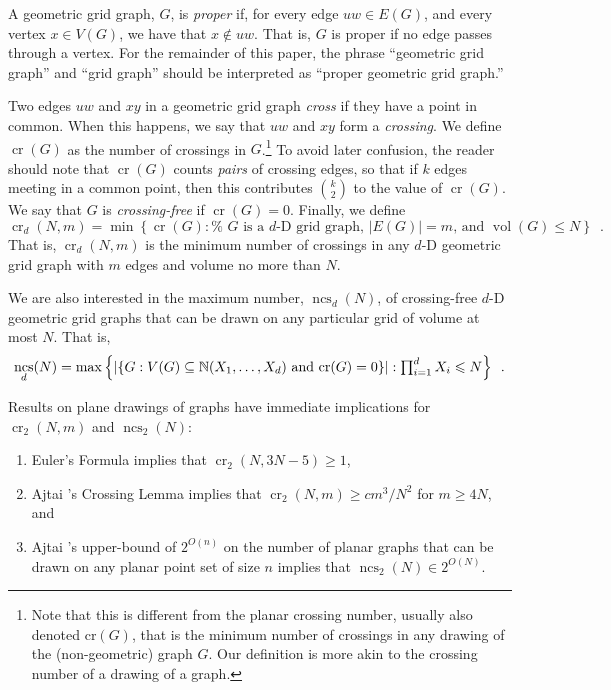 \documentclass[12pt]{article}
\newcommand{\n}{N}
\DeclareMathOperator{\crs}{cr}
\DeclareMathOperator{\ncs}{ncs}
\DeclareMathOperator{\volume}{vol}
\begin{document}
A geometric grid graph, $G$, is \emph{proper} if, for every edge $uw\in
E(G)$, and every vertex $x\in V(G)$, we have that $x\not\in uw$.  That is,
$G$ is proper if no edge passes through a vertex.  For the remainder
of this paper, the phrase ``geometric grid graph'' and ``grid graph''
should be interpreted as ``proper geometric grid graph.''

Two edges $uw$ and $xy$ in a geometric grid graph \emph{cross} if they have a
point in common.  When this happens, we say that $uw$ and $xy$ form
a \emph{crossing}.  We define $\crs(G)$ as the number of crossings
in $G$.\footnote{Note that this is different from the planar crossing
number, usually also denoted $\mathrm{cr}(G)$, that is the minimum number of
crossings in any drawing of the (non-geometric) graph $G$.  Our definition
is more akin to the crossing number of a drawing of a graph.}
To avoid later confusion, the reader should note that 
$\crs(G)$ counts \emph{pairs} of crossing edges, so that if $k$ edges meeting in 
a common point, then this contributes $\binom{k}{2}$ to the value of $\crs(G)$.
We say that
$G$ is \emph{crossing-free} if $\crs(G)=0$.  Finally, we define
\[ \crs_d(\n,m)=\min\left\{\crs(G):\mbox{%
    $G$ is a $d$-D grid graph, $|E(G)|=m$, and $\volume(G)\le\n$}
   \right\} \enspace .
\]
That is, $\crs_d(\n,m)$ is the minimum number of crossings in any
$d$-D geometric grid graph with $m$ edges and volume no more
than $\n$.

We are also interested in the maximum number, $\ncs_d(\n)$, of crossing-free
$d$-D geometric grid graphs that can be drawn on any particular grid of
volume at most $\n$.  That is,
\[
  \ncs_d(\n) = \max\left\{
     \left|\left\{G:\mbox{$V(G)\subseteq\N(X_1,\ldots,X_d)$
            and $\crs(G)=0$} \right\}\right| :
    \mbox{$\prod_{i=1}^d X_i \le\n$} \right\} \enspace .
\]

Results on plane drawings of graphs have immediate implications
for $\crs_2(\n,m)$ and $\ncs_2(\n)$:
\begin{enumerate}
  \item  Euler's Formula implies that $\crs_2(\n,3\n-5)\ge 1$,
  \item  Ajtai \etal's Crossing Lemma implies that $\crs_2(\n,m)\ge
  cm^3/\n^2$ for $m\ge 4\n$, and
  \item  Ajtai \etal's upper-bound of $2^{O(n)}$ on the number of planar
  graphs that can be drawn on any planar point set of size $n$ implies that
  $\ncs_2(\n)\in 2^{O(\n)}$.
\end{enumerate}
\end{document}
